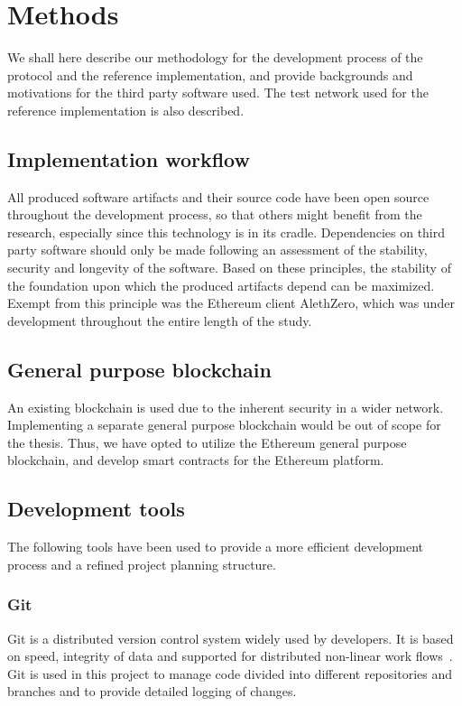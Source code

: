 \chapter{Methods}
We shall here describe our methodology for the development process of the protocol and the reference implementation, and provide backgrounds and motivations for the third party software used. The test network used for the reference implementation is also described.

\section{Implementation workflow}
All produced software artifacts and their source code have been open source throughout the development process, so that others might benefit from the research, especially since this technology is in its cradle. Dependencies on third party software should only be made following an assessment of the stability, security and longevity of the software. Based on these principles, the stability of the foundation upon which the produced artifacts depend can be maximized. Exempt from this principle was the Ethereum client AlethZero, which was under development throughout the entire length of the study. 

\section{General purpose blockchain}
An existing blockchain is used due to the inherent security in a wider network. Implementing a separate general purpose blockchain would be out of scope for the thesis. Thus, we have opted to utilize the Ethereum general purpose blockchain, and develop smart contracts for the Ethereum platform.

\section{Development tools}
The following tools have been used to provide a more efficient development process and a refined project planning structure.

\subsection{Git}
Git is a distributed version control system widely used by developers. It is based on speed, integrity of data and supported for distributed non-linear work flows~\cite{git}. Git is used in this project to manage code divided into different repositories and branches and to provide detailed logging of changes. 

